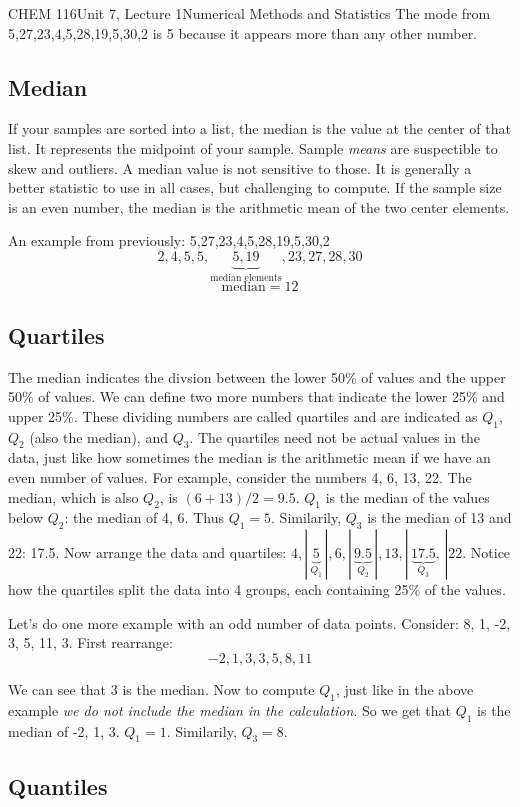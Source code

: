\documentclass{article}
\begin{document}
\begin{tdoc}{CHEM 116}{Unit 7, Lecture 1}{Numerical Methods and Statistics}
The mode from 5,27,23,4,5,28,19,5,30,2 is 5 because it appears more than any other number.

\subsection{Median}
If your samples are sorted into a list, the median is the value at the
center of that list. It represents the midpoint of your sample. Sample \textit{means} are suspectible to skew and outliers. A median
value is not sensitive to those. It is generally a better
statistic to use in all cases, but challenging to compute. If the sample size is an
even number, the median is the arithmetic mean of the two center
elements.

An example from previously: 5,27,23,4,5,28,19,5,30,2
\[
2,4,5,5,\underbrace{5,19}_{\textrm{median elements}},23,27,28,30
\]
\[
\textrm{median} = 12
\]

\subsection{Quartiles}

The median indicates the divsion between the lower 50\% of values and the upper 50\% of values. We can define two more numbers that indicate the lower 25\% and upper 25\%. These dividing numbers are called quartiles and are indicated as $Q_1$, $Q_2$ (also the median), and $Q_3$. The quartiles need not be actual values in the data, just like how sometimes the median is the arithmetic mean if we have an even number of values. For example, consider the numbers 4, 6, 13, 22. The median, which is also $Q_2$, is $(6 + 13) / 2 = 9.5$. $Q_1$ is the median of the values below $Q_2$: the median of 4, 6. Thus $Q_1 = 5$. Similarily, $Q_3$ is the median of 13 and 22: 17.5. Now arrange the data and quartiles: $ 4, |\,\underbrace{5}_{Q_1}\,|, 6, |\,\underbrace{9.5}_{Q_2}\,|, 13, |\,\underbrace{17.5}_{Q_3},\,| 22$. Notice how the quartiles split the data into 4 groups, each containing 25\% of the values.

Let's do one more example with an odd number of data points. Consider: 8, 1, -2, 3, 5, 11, 3. First rearrange:
\[
-2, 1, 3, 3, 5, 8, 11
\]

We can see that $3$ is the median. Now to compute $Q_1$, just like in the above example \textit{we do not include the median in the calculation}. So we get that $Q_1$ is the median of -2, 1, 3. $Q_1 = 1$. Similarily, $Q_3 = 8$.

\subsection{Quantiles}


\end{tdoc}
\end{document}
